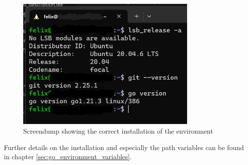 \begin{figure}
	\centering
	\includegraphics[width=0.8\textwidth]{figures/goLang/installation_screendump.png}
	\caption{Screendump showing the correct installation of the environment}
	\label{fig:screendump_installation}
\end{figure}

Further details on the installation and especially the path variables can be found in chapter \ref*{sec:go_environment_variables}.